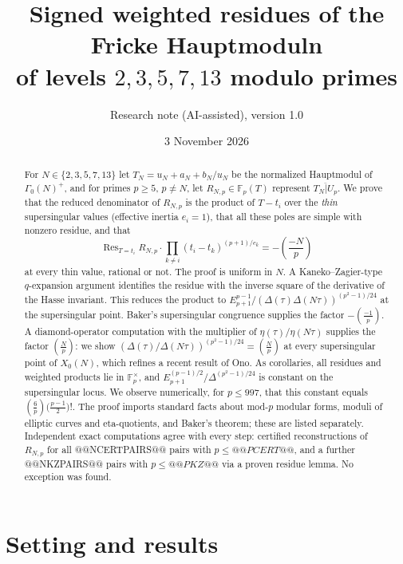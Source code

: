 \documentclass[11pt,a4paper]{article}
\title{Signed weighted residues of the Fricke Hauptmoduln\\
of levels $2,3,5,7,13$ modulo primes}
\author{Research note (AI-assisted), version 1.0}
\date{3 November 2026}
\numberwithin{equation}{section}
\theoremstyle{definition}
\theoremstyle{remark}
\newcommand{\Fp}{\mathbb F_p}
\newcommand{\Res}{\operatorname{Res}}
\newcommand{\Lp}[1]{\left(\frac{#1}{p}\right)}
\begin{document}
\maketitle

\begin{abstract}
For $N\in\{2,3,5,7,13\}$ let $T_N=u_N+a_N+b_N/u_N$ be the normalized Hauptmodul of
$\Gamma_0(N)^+$, and for primes $p\ge5$, $p\ne N$, let $R_{N,p}\in\Fp(T)$ represent
$\overline{T_N|U_p}$. We prove that the reduced denominator of $R_{N,p}$ is the product of
$T-t_i$ over the \emph{thin} supersingular values (effective inertia $e_i=1$), that all
these poles are simple with nonzero residue, and that
\[
\Res_{T=t_i}R_{N,p}\cdot\prod_{k\ne i}(t_i-t_k)^{(p+1)/e_k}=-\Lp{-N}
\]
at every thin value, rational or not. The proof is uniform in $N$. A Kaneko--Zagier-type
$q$-expansion argument identifies the residue with the inverse square of the derivative of
the Hasse invariant. This reduces the product to $E_{p+1}^{p-1}/(\Delta(\tau)\Delta(N\tau))^{(p^2-1)/24}$
at the supersingular point. Baker's supersingular congruence supplies the factor
$-\left(\frac{-1}{p}\right)$. A diamond-operator computation with the multiplier of
$\eta(\tau)/\eta(N\tau)$ supplies the factor $\left(\frac{N}{p}\right)$: we show
$(\Delta(\tau)/\Delta(N\tau))^{(p^2-1)/24}=\left(\frac{N}{p}\right)$ at every supersingular
point of $X_0(N)$, which refines a recent result of Ono. As corollaries, all residues and
weighted products lie in $\Fp^\times$, and
$E_{p+1}^{(p-1)/2}/\Delta^{(p^2-1)/24}$ is constant on the supersingular locus. We observe
numerically, for $p\le997$, that this constant equals $\left(\frac{6}{p}\right)\bigl(\frac{p-1}{2}\bigr)!$.
The proof imports standard facts about mod-$p$ modular forms, moduli of elliptic curves and
eta-quotients, and Baker's theorem; these are listed separately. Independent exact
computations agree with every step: certified reconstructions of $R_{N,p}$ for all
@@NCERTPAIRS@@ pairs with $p\le @@PCERT@@$, and a further @@NKZPAIRS@@ pairs with $p\le @@PKZ@@$ via a proven
residue lemma. No exception was found.
\end{abstract}

\tableofcontents

\section{Setting and results}\label{sec:intro}
\end{document}
